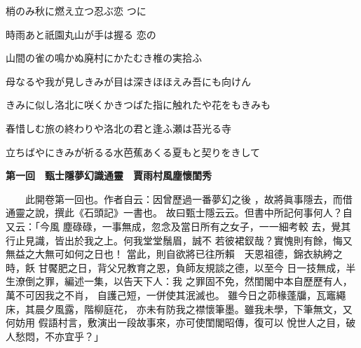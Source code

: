 \documentclass[森,禁則,名前]{genkou}
\begin{document}
\gtfamily 

梢のみ秋に燃え立つ忍ぶ恋
つに

時雨あと祇園丸山が手は握る
恋の

山間の雀の鳴かぬ廃村にかたむき椎の実拾ふ

母なるや我が見しきみが目は深きほほえみ吾にも向けん

きみに似し洛北に咲くかきつばた指に触れたや花をもきみも

春惜しむ旅の終わりや洛北の君と逢ふ瀬は苔光る寺

立ちばやにきみが祈るる水芭蕉あくる夏もと契りをきして


\clearpage

{ \par \noindent \gtfamily \bfseries
第一回　甄士隱夢幻識通靈　賈雨村風塵懷閨秀
}

\ukai

　　此開卷第一回也。作者自云：因曾歷過一番夢幻之後
，故將眞事隱去，而借通靈之說，撰此《石頭記》一書也。
故曰甄士隱云云。但書中所記何事何人？自又云：「今風
塵碌碌，一事無成，忽念及當日所有之女子，一一細考較
去，覺其行止見識，皆出於我之上。何我堂堂鬚眉，誠不
若彼裙釵哉？實愧則有餘，悔又無益之大無可如何之日也！
當此，則自欲將已往所賴　天恩祖德，錦衣紈絝之時，飫
甘饜肥之日，背父兄教育之恩，負師友規談之德，以至今
日一技無成，半生潦倒之罪，編述一集，以告天下人：我
之罪固不免，然閨閣中本自歷歷有人，萬不可因我之不肖，
自護己短，一併使其泯滅也。
雖今日之茆椽蓬牖，瓦竈繩床，其晨夕風露，階柳庭花，
亦未有防我之襟懷筆墨。雖我未學，下筆無文，又何妨用
假語村言，敷演出一段故事來，亦可使閨閣昭傳，復可以
悅世人之目，破人愁悶，不亦宜乎？」
\end{document}
